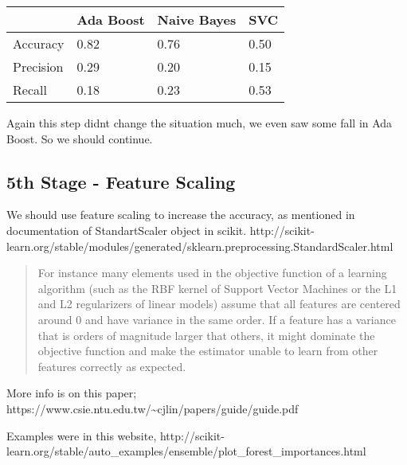\documentclass[11pt]{article}
\begin{document}
    \begin{longtable}[]{@{}llll@{}}
\toprule
& Ada Boost & Naive Bayes & SVC\tabularnewline
\midrule
\endhead
Accuracy & 0.82 & 0.76 & 0.50\tabularnewline
Precision & 0.29 & 0.20 & 0.15\tabularnewline
Recall & 0.18 & 0.23 & 0.53\tabularnewline
\bottomrule
\end{longtable}

    Again this step didnt change the situation much, we even saw some fall
in Ada Boost. So we should continue.

    \subsection{5th Stage - Feature
Scaling}\label{th-stage---feature-scaling}

    We should use feature scaling to increase the accuracy, as mentioned in
documentation of StandartScaler object in scikit.
http://scikit-learn.org/stable/modules/generated/sklearn.preprocessing.StandardScaler.html

\begin{quote}
For instance many elements used in the objective function of a learning
algorithm (such as the RBF kernel of Support Vector Machines or the L1
and L2 regularizers of linear models) assume that all features are
centered around 0 and have variance in the same order. If a feature has
a variance that is orders of magnitude larger that others, it might
dominate the objective function and make the estimator unable to learn
from other features correctly as expected.
\end{quote}

More info is on this paper;
https://www.csie.ntu.edu.tw/\textasciitilde{}cjlin/papers/guide/guide.pdf

Examples were in this website,
http://scikit-learn.org/stable/auto\_examples/ensemble/plot\_forest\_importances.html
\end{document}

